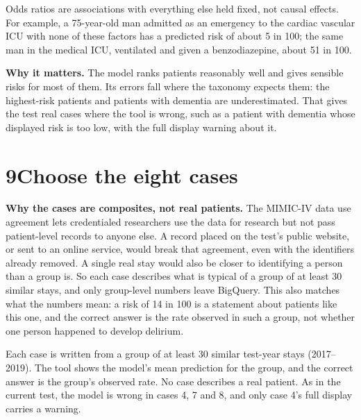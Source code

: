 \documentclass[11pt]{article}
\newcommand{\why}[1]{\begin{whynote}\textbf{\color{accent}Why it matters.} #1\end{whynote}}
\newcommand{\step}[2]{\section*{\color{accent}#1\quad\color{black}#2}}
\begin{document}
{\small\color{black!60}Odds ratios are associations with everything else held fixed, not causal effects. For example, a 75-year-old man admitted as an emergency to the cardiac vascular ICU with none of these factors has a predicted risk of about 5 in 100; the same man in the medical ICU, ventilated and given a benzodiazepine, about 51 in 100.\par}

\why{The model ranks patients reasonably well and gives sensible risks for most of them. Its errors fall where the taxonomy expects them: the highest-risk patients and patients with dementia are underestimated. That gives the test real cases where the tool is wrong, such as a patient with dementia whose displayed risk is too low, with the full display warning about it.}

\step{9}{Choose the eight cases}

\textbf{Why the cases are composites, not real patients.} The MIMIC-IV data use agreement lets credentialed researchers use the data for research but not pass patient-level records to anyone else. A record placed on the test's public website, or sent to an online service, would break that agreement, even with the identifiers already removed. A single real stay would also be closer to identifying a person than a group is. So each case describes what is typical of a group of at least 30 similar stays, and only group-level numbers leave BigQuery. This also matches what the numbers mean: a risk of 14 in 100 is a statement about patients like this one, and the correct answer is the rate observed in such a group, not whether one person happened to develop delirium.

Each case is written from a group of at least 30 similar test-year stays (2017--2019). The tool shows the model's mean prediction for the group, and the correct answer is the group's observed rate. No case describes a real patient. As in the current test, the model is wrong in cases 4, 7 and 8, and only case 4's full display carries a warning.
\end{document}

